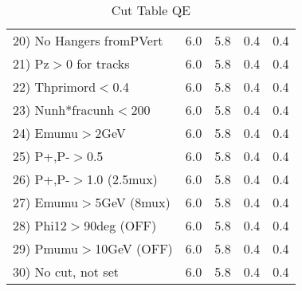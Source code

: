 \begin{table}[h!]
\begin{tabular}{||l||r|r|r|r||}
 20) No Hangers fromPVert &         6.0 &         5.8 &         0.4 &         0.4 \\
 21) Pz$>$0 for tracks    &         6.0 &         5.8 &         0.4 &         0.4 \\
 22) Thprimord$<$0.4      &         6.0 &         5.8 &         0.4 &         0.4 \\
 23) Nunh*fracunh$<$200   &         6.0 &         5.8 &         0.4 &         0.4 \\
 24) Emumu$>$2GeV         &         6.0 &         5.8 &         0.4 &         0.4 \\
 25) P+,P-$>$0.5          &         6.0 &         5.8 &         0.4 &         0.4 \\
 26) P+,P-$>$1.0 (2.5mux) &         6.0 &         5.8 &         0.4 &         0.4 \\
 27) Emumu$>$5GeV  (8mux) &         6.0 &         5.8 &         0.4 &         0.4 \\
 28) Phi12$>$90deg  (OFF) &         6.0 &         5.8 &         0.4 &         0.4 \\
 29) Pmumu$>$10GeV  (OFF) &         6.0 &         5.8 &         0.4 &         0.4 \\
 30) No cut, not set      &         6.0 &         5.8 &         0.4 &         0.4 \\
 \hline
 \hline
 \end{tabular}
 \caption{Cut Table  QE     }
 \label{tab-cut____qe}
 \end{table}
